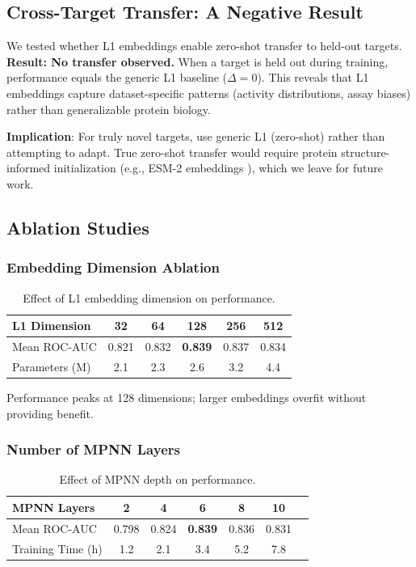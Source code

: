 \documentclass{article}
\begin{document}
\subsection{Cross-Target Transfer: A Negative Result}

We tested whether L1 embeddings enable zero-shot transfer to held-out targets. \textbf{Result: No transfer observed.} When a target is held out during training, performance equals the generic L1 baseline ($\Delta = 0$). This reveals that L1 embeddings capture dataset-specific patterns (activity distributions, assay biases) rather than generalizable protein biology.

\textbf{Implication}: For truly novel targets, use generic L1 (zero-shot) rather than attempting to adapt. True zero-shot transfer would require protein structure-informed initialization (e.g., ESM-2 embeddings \citep{lin_2023_esm2}), which we leave for future work.

\subsection{Ablation Studies}

\subsubsection{Embedding Dimension Ablation}

\begin{table}[h]
\caption{Effect of L1 embedding dimension on performance.}
\label{tab:dim_ablation}
\centering
\small
\begin{tabular}{@{}lccccc@{}}
\toprule
L1 Dimension & 32 & 64 & 128 & 256 & 512 \\
\midrule
Mean ROC-AUC & 0.821 & 0.832 & \textbf{0.839} & 0.837 & 0.834 \\
Parameters (M) & 2.1 & 2.3 & 2.6 & 3.2 & 4.4 \\
\bottomrule
\end{tabular}
\end{table}

Performance peaks at 128 dimensions; larger embeddings overfit without providing benefit.

\subsubsection{Number of MPNN Layers}

\begin{table}[h]
\caption{Effect of MPNN depth on performance.}
\label{tab:depth_ablation}
\centering
\small
\begin{tabular}{@{}lcccccc@{}}
\toprule
MPNN Layers & 2 & 4 & 6 & 8 & 10 \\
\midrule
Mean ROC-AUC & 0.798 & 0.824 & \textbf{0.839} & 0.836 & 0.831 \\
Training Time (h) & 1.2 & 2.1 & 3.4 & 5.2 & 7.8 \\
\bottomrule
\end{tabular}
\end{table}
\end{document}
